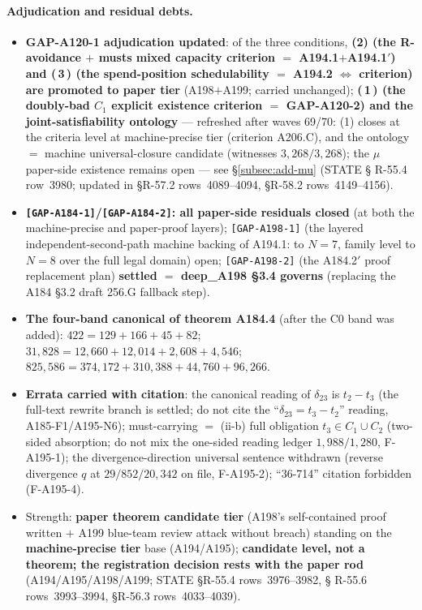 \paragraph{Adjudication and residual debts.}
\begin{itemize}
\item \textbf{GAP-A120-1 adjudication updated}: of the three conditions,
\textbf{(2) (the R-avoidance $+$ musts mixed capacity
criterion $=$ A194.1$+$A194.1$'$) and (\,3\,) (the spend-position
schedulability $=$ A194.2 $\iff$ criterion) are promoted to paper tier}
(A198$+$A199; carried unchanged); \textbf{(\,1\,) (the doubly-bad $C_1$
explicit existence criterion $=$ GAP-A120-2) and the joint-satisfiability
ontology} --- refreshed after waves 69/70: (1) closes at the criteria level
at machine-precise tier (criterion A206.C), and the ontology $=$ machine
universal-closure candidate (witnesses $3{,}268/3{,}268$); the $\mu$
paper-side existence remains open --- see \S\ref{subsec:add-mu} (STATE \S
R-55.4 row~3980; updated in \S R-57.2 rows~4089--4094, \S R-58.2
rows~4149--4156).
\item \textbf{\texttt{[GAP-A184-1]}/\texttt{[GAP-A184-2]}: all paper-side
residuals closed} (at both the machine-precise and paper-proof layers);
\texttt{[GAP-A198-1]} (the layered independent-second-path machine backing
of A194.1: to $N=7$, family level to $N=8$ over the full legal domain)
open; \texttt{[GAP-A198-2]} (the A184.2$'$ proof replacement plan)
\textbf{settled $=$ deep\_A198 \S3.4 governs} (replacing the A184 \S3.2
draft 256.G fallback step).
\item \textbf{The four-band canonical of theorem A184.4} (after the C0 band
was added): $422=129+166+45+82$;
$31{,}828=12{,}660+12{,}014+2{,}608+4{,}546$;
$825{,}586=374{,}172+310{,}388+44{,}760+96{,}266$.
\item \textbf{Errata carried with citation}: the canonical reading of
$\delta_{23}$ is \textbf{$t_2-t_3$} (the full-text rewrite branch is
settled; do not cite the ``$\delta_{23}=t_3-t_2$'' reading, A185-F1/A195-N6);
must-carrying $=$ (ii-b) full obligation $t_3\in C_1\cup C_2$ (two-sided
absorption; do not mix the one-sided reading ledger $1{,}988/1{,}280$,
F-A195-1); the divergence-direction universal sentence withdrawn (reverse
divergence $q$ at $29/852/20{,}342$ on file, F-A195-2); ``36-714'' citation
forbidden (F-A195-4).
\item Strength: \textbf{paper theorem candidate tier} (A198's
self-contained proof written $+$ A199 blue-team review attack without
breach) standing on the \textbf{machine-precise tier} base (A194/A195);
\textbf{candidate level, not a theorem; the registration decision rests with
the paper rod} (A194/A195/A198/A199; STATE \S R-55.4 rows~3976--3982, \S
R-55.6 rows~3993--3994, \S R-56.3 rows~4033--4039).
\end{itemize}

